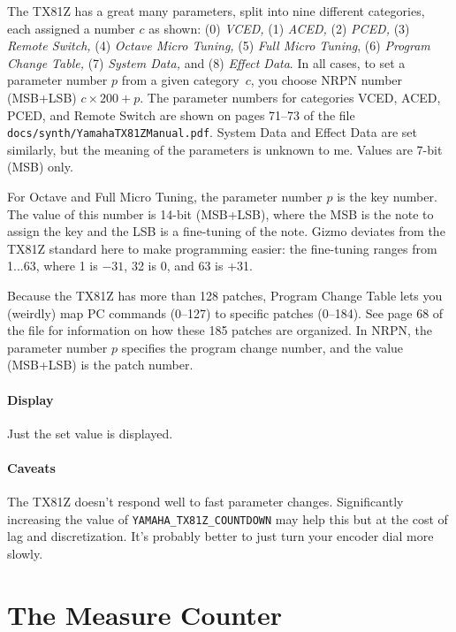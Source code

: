 \documentclass{article}
\begin{document}
The TX81Z has a great many parameters, split into nine different categories, each assigned a number \(c\) as shown:  (0) {\it VCED,} (1) {\it ACED,} (2) {\it PCED,}  (3) {\it Remote Switch,}  (4) {\it Octave Micro Tuning,} (5) {\it Full Micro Tuning},  (6) {\it Program Change Table,} (7) {\it System Data,} and (8) {\it Effect Data}.  In all cases, to set a parameter number \(p\) from a given category~\(c\), you choose NRPN number (MSB+LSB) \(c \times 200 + p\). The parameter numbers for categories VCED, ACED, PCED, and Remote Switch are shown on pages 71--73 of the file \texttt{docs/synth/YamahaTX81ZManual.pdf}.   System Data and Effect Data are set similarly, but the meaning of the parameters is unknown to me.  Values are 7-bit (MSB) only.

For Octave and Full Micro Tuning, the parameter number \(p\) is the key number.  The value of this number is 14-bit (MSB+LSB), where the MSB is the note to assign the key and the LSB is a fine-tuning of the note.  Gizmo deviates from the TX81Z standard here to make programming easier: the fine-tuning ranges from 1...63, where 1 is \(-31\), 32 is 0, and 63 is +31.

Because the TX81Z has more than 128 patches, Program Change Table lets you (weirdly) map PC commands (0--127) to specific patches (0--184).  See page 68 of the file for information on how these 185 patches are organized.  In NRPN, the parameter number \(p\) specifies the program change number, and the value (MSB+LSB) is the patch number.

\paragraph{Display} Just the set value is displayed.

\paragraph{Caveats}  The TX81Z doesn't respond well to fast parameter changes.    Significantly increasing the value of \texttt{YAMAHA\_TX81Z\_COUNTDOWN} may help this but at the cost of lag and discretization.  It's probably better to just turn your encoder dial more slowly.


\clearpage

\section {The Measure Counter}
\label{measure}
\end{document}

